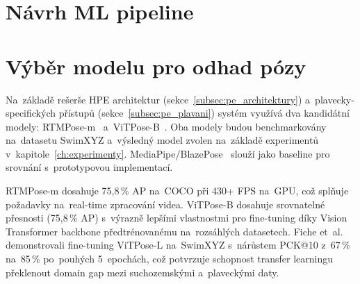 



\section{Návrh ML pipeline}
\label{sec:ml_pipeline_navrh}


\section{Výběr modelu pro odhad pózy}
\label{sec:vyber_modelu}

Na~základě rešerše HPE architektur (sekce~\ref{subsec:pe_architektury}) a~plavecky-specifických přístupů (sekce~\ref{subsec:pe_plavani}) systém využívá dva kandidátní modely: RTMPose-m~\cite{jiang2023rtmpose} a~ViTPose-B~\cite{xu2022vitpose}. Oba modely budou benchmarkovány na~datasetu SwimXYZ a~výsledný model zvolen na~základě experimentů v~kapitole~\ref{ch:experimenty}. MediaPipe/BlazePose~\cite{blazepose2020} slouží jako baseline pro srovnání s~prototypovou implementací.

RTMPose-m dosahuje 75,8\,\% AP na~COCO při 430+ FPS na~GPU, což splňuje požadavky na~real-time zpracování videa. ViTPose-B dosahuje srovnatelné přesnosti (75,8\,\% AP) s~výrazně lepšími vlastnostmi pro fine-tuning díky Vision Transformer backbone předtrénovanému na~rozsáhlých datasetech. Fiche et~al.~\cite{fiche2023swimxyz} demonstrovali fine-tuning ViTPose-L na~SwimXYZ s~nárůstem PCK@10 z~67\,\% na~85\,\% po~pouhých 5~epochách, což potvrzuje schopnost transfer learningu překlenout domain gap mezi suchozemskými a~plaveckými daty.

